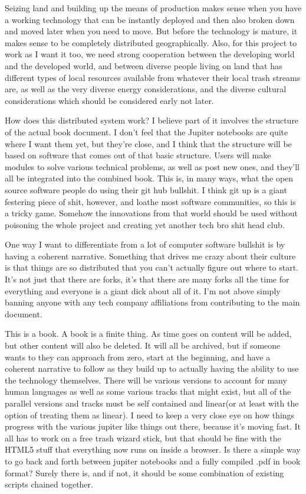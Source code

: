 Seizing land and building up the means of production makes sense when
you have a working technology that can be instantly deployed and then
also broken down and moved later when you need to move. But before the
technology is mature, it makes sense to be completely distributed
geographically. Also, for this project to work as I want it too, we need
strong cooperation between the developing world and the developed world,
and between diverse people living on land that has different types of
local resources available from whatever their local trash streams are,
as well as the very diverse energy considerations, and the diverse
cultural considerations which should be considered early not later.

How does this distributed system work? I believe part of it involves the
structure of the actual book document. I don't feel that the Jupiter
notebooks are quite where I want them yet, but they're close, and I
think that the structure will be based on software that comes out of
that basic structure. Users will make modules to solve various technical
problems, as well as post new ones, and they'll all be integrated into
the combined book. This is, in many ways, what the open source software
people do using their git hub bullshit. I think git up is a giant
festering piece of shit, however, and loathe most software communities,
so this is a tricky game. Somehow the innovations from that world should
be used without poisoning the whole project and creating yet another
tech bro shit head club.

One way I want to differentiate from a lot of computer software bullshit
is by having a coherent narrative. Something that drives me crazy about
their culture is that things are so distributed that you can't actually
figure out where to start. It's not just that there are forks, it's that
there are many forks all the time for everything and everyone is a giant
dick about all of it. I'm not above simply banning anyone with any tech
company affiliations from contributing to the main document.

This is a book. A book is a finite thing. As time goes on content will
be added, but other content will also be deleted. It will all be
archived, but if someone wants to they can approach from zero, start at
the beginning, and have a coherent narrative to follow as they build up
to actually having the ability to use the technology themselves. There
will be various versions to account for many human languages as well as
some various tracks that might exist, but all of the parallel versions
and tracks must be self contained and linear(or at least with the option
of treating them as linear). I need to keep a very close eye on how
things progress with the various jupiter like things out there, because
it's moving fast. It all has to work on a free trash wizard stick, but
that should be fine with the HTML5 stuff that everything now runs on
inside a browser. Is there a simple way to go back and forth between
jupiter notebooks and a fully compiled .pdf in book format? Surely there
is, and if not, it should be some combination of existing scripts
chained together.

